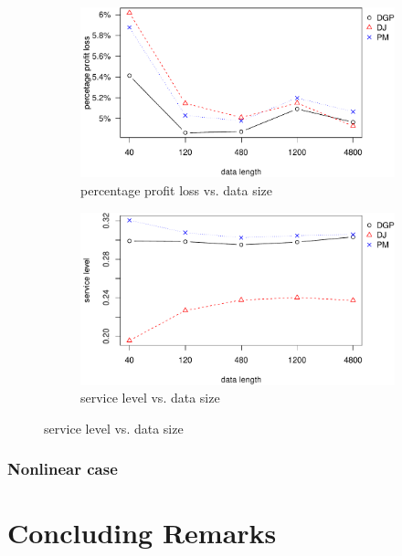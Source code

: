 \documentclass{article}
\begin{document}
\begin{figure}
\centering
\caption{Performance vs. data size with Laplace distributed error term}
\begin{subfigure}[b]{0.48\textwidth}
\centering
\includegraphics[width=\textwidth]{runif-plot_files/figure-latex/ppl-1.pdf}
\caption{percentage profit loss vs. data size}
\end{subfigure}
\hfill
\begin{subfigure}[b]{0.48\textwidth}
\centering
\includegraphics[width=\textwidth]{runif-plot_files/figure-latex/sl-1.pdf}
\caption{service level vs. data size}
\end{subfigure}
\label{fig:err}
\end{figure}

\subsubsection{Nonlinear case}


\section{Concluding Remarks} \label{se:end}
\end{document}
